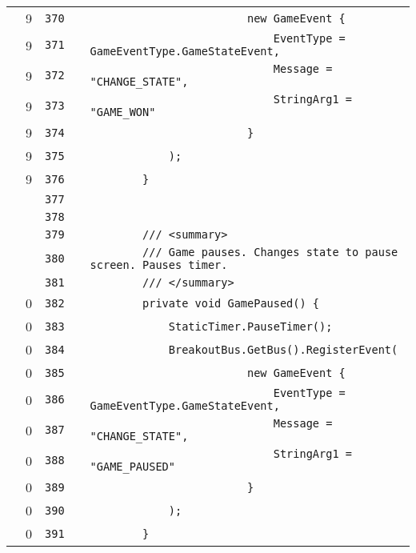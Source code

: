 \documentclass[a4paper,landscape,10pt]{article}
\begin{document}
\begin{longtable}[l]{lrrll}
\cellcolor{green} & 9 & \verb~370~ & & \verb~                        new GameEvent {~\\
\cellcolor{green} & 9 & \verb~371~ & & \verb~                            EventType = GameEventType.GameStateEvent,~\\
\cellcolor{green} & 9 & \verb~372~ & & \verb~                            Message = "CHANGE_STATE",~\\
\cellcolor{green} & 9 & \verb~373~ & & \verb~                            StringArg1 = "GAME_WON"~\\
\cellcolor{green} & 9 & \verb~374~ & & \verb~                        }~\\
\cellcolor{green} & 9 & \verb~375~ & & \verb~            );~\\
\cellcolor{green} & 9 & \verb~376~ & & \verb~        }~\\
\cellcolor{gray} &  & \verb~377~ & & \verb~~\\
\cellcolor{gray} &  & \verb~378~ & & \verb~~\\
\cellcolor{gray} &  & \verb~379~ & & \verb~        /// <summary>~\\
\cellcolor{gray} &  & \verb~380~ & & \verb~        /// Game pauses. Changes state to pause screen. Pauses timer.~\\
\cellcolor{gray} &  & \verb~381~ & & \verb~        /// </summary>~\\
\cellcolor{red} & 0 & \verb~382~ & & \verb~        private void GamePaused() {~\\
\cellcolor{red} & 0 & \verb~383~ & & \verb~            StaticTimer.PauseTimer();~\\
\cellcolor{red} & 0 & \verb~384~ & & \verb~            BreakoutBus.GetBus().RegisterEvent(~\\
\cellcolor{red} & 0 & \verb~385~ & & \verb~                        new GameEvent {~\\
\cellcolor{red} & 0 & \verb~386~ & & \verb~                            EventType = GameEventType.GameStateEvent,~\\
\cellcolor{red} & 0 & \verb~387~ & & \verb~                            Message = "CHANGE_STATE",~\\
\cellcolor{red} & 0 & \verb~388~ & & \verb~                            StringArg1 = "GAME_PAUSED"~\\
\cellcolor{red} & 0 & \verb~389~ & & \verb~                        }~\\
\cellcolor{red} & 0 & \verb~390~ & & \verb~            );~\\
\cellcolor{red} & 0 & \verb~391~ & & \verb~        }~\\

\end{longtable}
\end{document}
